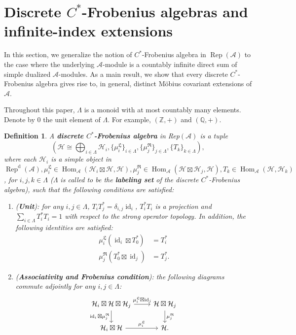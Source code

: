 \documentclass{article}
\newtheorem{definition}{Definition}
\newcommand{\hilb}{\mathcal{H}}
\newcommand{\A}{\mathcal{A}}
\newcommand{\Z}{\mathbb{Z}}
\begin{document}
\section{Discrete $C^*$-Frobenius algebras and infinite-index extensions}
In this section, we generalize the notion of  $C^*$-Frobenius algebra in $\operatorname{Rep}(\A)$ to the case where the underlying $\A$-module is a countably infinite direct sum of simple dualized $\A$-modules. As a main result, we show that 
every discrete $C^*$-Frobenius algebra gives rise to, in general, distinct M\"{o}bius covariant extensions of $\A$. 

Throughout this paper, $\Lambda$ is a monoid with at most countably many elements. Denote by $0$ the unit element of $\Lambda$.
For example, $(\Z,+)$ and $(\mathbb{Q},+)$.

\begin{definition}\label{definitionCFro}    
    A \textbf{ discrete $C^\ast$-Frobenius algebra} in Rep$(\A)$ is a tuple 
    \[
     \left(\hilb \cong \bigoplus_{i\in\Lambda}\hilb_i, \{\mu_i^{\mathfrak{L}}\}_{i\in\Lambda}, \{\mu_j^{\mathfrak{R}}\}_{j\in\Lambda }, \{T_k\}_{k\in\Lambda}\right),
    \]
    where each $ \hilb_i$ is a simple object in $\operatorname{Rep}^{\operatorname{d}}(\A), \mu_i^{\mathfrak{L}}\in\operatorname{Hom}_{\A}(\hilb_i\boxtimes \hilb, \hilb), \mu_j^{\mathfrak{R}} \in \operatorname{Hom}_{\A}(\hilb \boxtimes\hilb_j, \hilb), T_k\in\operatorname{Hom}_{\A}(\hilb, \hilb_k)$, for $i,j,k \in\Lambda$ ($\Lambda$ is called to be the \textbf{labeling set} of the discrete $C^*$-Frobenius algebra), such that the following conditions are satisfied: 
   \begin{enumerate}
       \item (\textbf{Unit}):  for any $i,j \in \Lambda$, $T_i T_j^* = \delta_{i,j}\operatorname{id}_i$, $T_i^*T_i$ is a projection and $\sum_{i\in\Lambda} T_i^*T_i = 1$ with respect to the strong operator topology. In addition, the following identities are satisfied:
       \begin{align*}
           \mu^{\mathfrak{L}}_i(\operatorname{id}_i \boxtimes T_0^* )&= T_i^* \\ 
           \mu_j^{\mathfrak{R}}(T_0^* \boxtimes \operatorname{id}_j) &= T^*_j.
       \end{align*}
       \item (\textbf{Associativity and Frobenius condition}): the following diagrams commute adjointly for any $i,j\in\Lambda$: 
       \[\begin{tikzcd}
\hilb_i\boxtimes \hilb \boxtimes \hilb_j \arrow{r}{\mu_i^{\mathfrak{L}}\boxtimes\operatorname{id}_j} \arrow[swap]{d}{\operatorname{id}_i\boxtimes\mu_j^{\mathfrak{R}}} & \hilb\boxtimes\hilb_j \arrow{d}{\mu_j^{\mathfrak{R}}} \\%
\hilb_i\boxtimes \hilb \arrow{r}{\mu_i^{\mathfrak{L}}}& \hilb.\\
\end{tikzcd}
\]
     \end{enumerate}
\end{definition}
\end{document}
